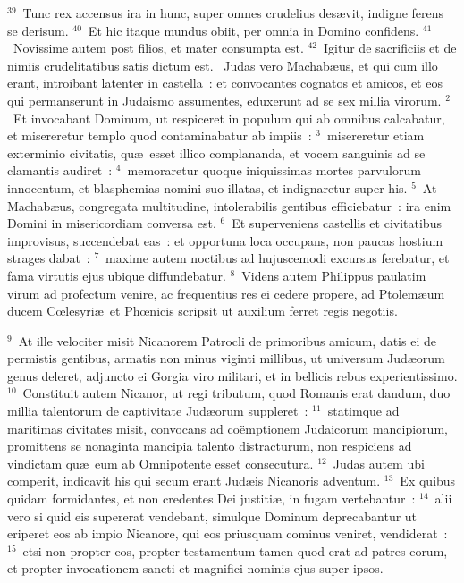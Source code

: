 ${}^{39}$~Tunc rex accensus ira in hunc, super omnes crudelius des\ae vit, indigne ferens se derisum.
${}^{40}$~Et hic itaque mundus obiit, per omnia in Domino confidens.
${}^{41}$~Novissime autem post filios, et mater consumpta est.
${}^{42}$~Igitur de sacrificiis et de nimiis crudelitatibus satis dictum est.
~\lettrine[lines=10,image=true,loversize=0.05,lraise=-0.03]{J}{}udas vero Machab\ae us, et qui cum illo erant, introibant latenter in castella~: et convocantes cognatos et amicos, et eos qui permanserunt in Judaismo assumentes, eduxerunt ad se sex millia virorum.
${}^{2}$~Et invocabant Dominum, ut respiceret in populum qui ab omnibus calcabatur, et misereretur templo quod contaminabatur ab impiis~:
${}^{3}$~misereretur etiam exterminio civitatis, qu\ae\ esset illico complananda, et vocem sanguinis ad se clamantis audiret~:
${}^{4}$~memoraretur quoque iniquissimas mortes parvulorum innocentum, et blasphemias nomini suo illatas, et indignaretur super his.
${}^{5}$~At Machab\ae us, congregata multitudine, intolerabilis gentibus efficiebatur~: ira enim Domini in misericordiam conversa est.
${}^{6}$~Et superveniens castellis et civitatibus improvisus, succendebat eas~: et opportuna loca occupans, non paucas hostium strages dabat~:
${}^{7}$~maxime autem noctibus ad hujuscemodi excursus ferebatur, et fama virtutis ejus ubique diffundebatur.
${}^{8}$~Videns autem Philippus paulatim virum ad profectum venire, ac frequentius res ei cedere propere, ad Ptolem\ae um ducem Cœlesyri\ae\ et Phœnicis scripsit ut auxilium ferret regis negotiis.


${}^{9}$~At ille velociter misit Nicanorem Patrocli de primoribus amicum, datis ei de permistis gentibus, armatis non minus viginti millibus, ut universum Jud\ae orum genus deleret, adjuncto ei Gorgia viro militari, et in bellicis rebus experientissimo.
${}^{10}$~Constituit autem Nicanor, ut regi tributum, quod Romanis erat dandum, duo millia talentorum de captivitate Jud\ae orum suppleret~:
${}^{11}$~statimque ad maritimas civitates misit, convocans ad co\"emptionem Judaicorum mancipiorum, promittens se nonaginta mancipia talento distracturum, non respiciens ad vindictam qu\ae\ eum ab Omnipotente esset consecutura.
${}^{12}$~Judas autem ubi comperit, indicavit his qui secum erant Jud\ae is Nicanoris adventum.
${}^{13}$~Ex quibus quidam formidantes, et non credentes Dei justiti\ae , in fugam vertebantur~:
${}^{14}$~alii vero si quid eis supererat vendebant, simulque Dominum deprecabantur ut eriperet eos ab impio Nicanore, qui eos priusquam cominus veniret, vendiderat~:
${}^{15}$~etsi non propter eos, propter testamentum tamen quod erat ad patres eorum, et propter invocationem sancti et magnifici nominis ejus super ipsos.


